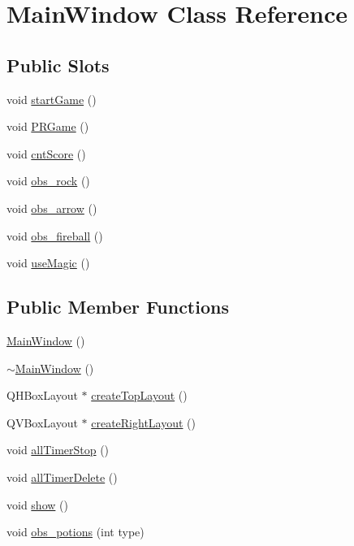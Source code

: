 \hypertarget{classMainWindow}{\section{\-Main\-Window \-Class \-Reference}
\label{classMainWindow}
}
\subsection*{\-Public \-Slots}
\begin{DoxyCompactItemize}
\item 
void \hyperlink{classMainWindow_aa05813d353cccf400d3561cc309089af}{start\-Game} ()
\item 
void \hyperlink{classMainWindow_a131e8a96974b343fa3c4db5c87bd998a}{\-P\-R\-Game} ()
\item 
void \hyperlink{classMainWindow_accaadf1f659d21b3b42936fa92105974}{cnt\-Score} ()
\item 
void \hyperlink{classMainWindow_aae8538f1c8cb2cb237cf5ec37f466962}{obs\-\_\-rock} ()
\item 
void \hyperlink{classMainWindow_af5ee93a6d6fba020361f5b464e473842}{obs\-\_\-arrow} ()
\item 
void \hyperlink{classMainWindow_a74ad58ce96c75e7247c81d2e35bf930f}{obs\-\_\-fireball} ()
\item 
void \hyperlink{classMainWindow_a6539c6d1567ac71efcb1ae8f970ef356}{use\-Magic} ()
\end{DoxyCompactItemize}
\subsection*{\-Public \-Member \-Functions}
\begin{DoxyCompactItemize}
\item 
\hyperlink{classMainWindow_a34c4b4207b46d11a4100c9b19f0e81bb}{\-Main\-Window} ()
\item 
\hyperlink{classMainWindow_ae98d00a93bc118200eeef9f9bba1dba7}{$\sim$\-Main\-Window} ()
\item 
\-Q\-H\-Box\-Layout $\ast$ \hyperlink{classMainWindow_aeea638e608801de4daa4616421d0b81f}{create\-Top\-Layout} ()
\item 
\-Q\-V\-Box\-Layout $\ast$ \hyperlink{classMainWindow_a5759955a0c2d843c5b244278b765e8d1}{create\-Right\-Layout} ()
\item 
void \hyperlink{classMainWindow_a4916d97dacc65392c9f40f79ff8c5236}{all\-Timer\-Stop} ()
\item 
void \hyperlink{classMainWindow_a61d155c76cadfab8e2a88fa43ad121c3}{all\-Timer\-Delete} ()
\item 
void \hyperlink{classMainWindow_ae3d7a4598609a86e8bd317c0d85c4495}{show} ()
\item 
void \hyperlink{classMainWindow_ab3ef07d462294c997c005d0da2ebf65c}{obs\-\_\-potions} (int type)
\end{DoxyCompactItemize}


